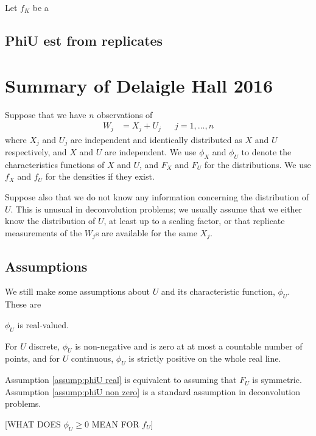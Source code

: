 	Let $f_K$ be a 

	
\subsection{PhiU est from replicates}

\section{Summary of Delaigle Hall 2016}
\label{sec:summary of delaigle hall}
	Suppose that we have $n$ observations of
	\begin{align}
		W_j &= X_j + U_j &&j = 1, \dots, n
	\end{align}
	where $X_j$ and $U_j$ are independent and identically distributed as $X$ and $U$ respectively, and $X$ and $U$ are independent. We use $\phi_X$ and $\phi_U$ to denote the characteristics functions of $X$ and $U$, and $F_X$ and $F_U$ for the distributions. We use $f_X$ and $f_U$ for the densities if they exist.

	Suppose also that we do not know any information concerning the distribution of $U$. This is unusual in deconvolution problems; we usually assume that we either know the distribution of $U$, at least up to a scaling factor, or that replicate measurements of the $W_j$s are available for the same $X_j$. 

	\subsection{Assumptions}
	We still make some assumptions about $U$ and its characteristic function, $\phi_U$. These are 
	\begin{assumption}
	\label{assump:phiU real}
		$\phi_U$ is real-valued.
	\end{assumption}
	\begin{assumption}
	\label{assump:phiU non zero}
		For $U$ discrete, $\phi_U$ is non-negative and is zero at at most a countable number of points, and for $U$ continuous, $\phi_U$ is strictly positive on the whole real line.
	\end{assumption}

	Assumption \ref{assump:phiU real} is equivalent to assuming that $F_U$ is symmetric. Assumption \ref{assump:phiU non zero} is a standard assumption in deconvolution problems.

	[WHAT DOES $\phi_U \geq 0$ MEAN FOR $f_U$]

